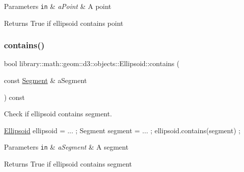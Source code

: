 \begin{DoxyParams}[1]{Parameters}
\mbox{\tt in}  & {\em a\+Point} & A point \\
\hline
\end{DoxyParams}
\begin{DoxyReturn}{Returns}
True if ellipsoid contains point 
\end{DoxyReturn}
\mbox{\label{classlibrary_1_1math_1_1geom_1_1d3_1_1objects_1_1_ellipsoid_a4b0c41a41fbd8f158da26825f04c47d5}} 
\subsubsection{\texorpdfstring{contains()}{contains()}\hspace{0.1cm}{\footnotesize\ttfamily [2/2]}}
{\footnotesize\ttfamily bool library\+::math\+::geom\+::d3\+::objects\+::\+Ellipsoid\+::contains (\begin{DoxyParamCaption}\item[{const \hyperlink{classlibrary_1_1math_1_1geom_1_1d3_1_1objects_1_1_segment}{Segment} \&}]{a\+Segment }\end{DoxyParamCaption}) const}



Check if ellipsoid contains segment. 


\begin{DoxyCode}
\hyperlink{classlibrary_1_1math_1_1geom_1_1d3_1_1objects_1_1_ellipsoid_aae81fe0edc7f0e8d4590ea89ae73cb14}{Ellipsoid} ellipsoid = ... ;
Segment segment = ... ;
ellipsoid.contains(segment) ;
\end{DoxyCode}



\begin{DoxyParams}[1]{Parameters}
\mbox{\tt in}  & {\em a\+Segment} & A segment \\
\hline
\end{DoxyParams}
\begin{DoxyReturn}{Returns}
True if ellipsoid contains segment 
\end{DoxyReturn}
\mbox{\label{classlibrary_1_1math_1_1geom_1_1d3_1_1objects_1_1_ellipsoid_a646be2506950d250db0fb6610979bb46}} 
